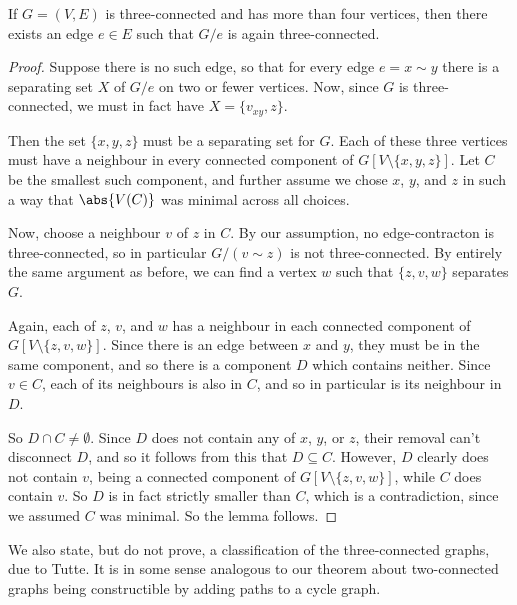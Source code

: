 \documentclass[nobib]{tufte-handout}
\begin{document}
\begin{lemma}\label{lemma:existence_of_contraction_edge}
  If $G = (V,E)$ is three-connected and has more than four vertices, then there exists an edge $e \in E$ such that $G/e$ is again three-connected.

  \begin{proof}
    Suppose there is no such edge, so that for every edge $e = x \sim y$ there is a separating set $X$ of $G/e$ on two or fewer vertices. Now, since $G$ is three-connected, we must in fact have $X = \{v_{xy}, z\}$.

    Then the set $\{x, y, z\}$ must be a separating set for $G$. Each of these three vertices must have a neighbour in every connected component of $G[V \setminus \{x,y,z\}]$. Let $C$ be the smallest such component, and further assume we chose $x$, $y$, and $z$ in such a way that $\abs{V(C)}$ was minimal across all choices.

    Now, choose a neighbour $v$ of $z$ in $C$. By our assumption, no edge-contracton is three-connected, so in particular $G/(v \sim z)$ is not three-connected. By entirely the same argument as before, we can find a vertex $w$ such that $\{z,v,w\}$ separates $G$.

    Again, each of $z$, $v$, and $w$ has a neighbour in each connected component of $G[V \setminus \{z, v, w\}]$. Since there is an edge between $x$ and $y$, they must be in the same component, and so there is a component $D$ which contains neither. Since $v \in C$, each of its neighbours is also in $C$, and so in particular is its neighbour in $D$.

    So $D \cap C \neq \emptyset$. Since $D$ does not contain any of $x$, $y$, or $z$, their removal can't disconnect $D$, and so it follows from this that $D \subseteq C$. However, $D$ clearly does not contain $v$, being a connected component of $G[V \setminus \{z, v, w\}]$, while $C$ does contain $v$. So $D$ is in fact strictly smaller than $C$, which is a contradiction, since we assumed $C$ was minimal. So the lemma follows.
  \end{proof}
\end{lemma}

We also state, but do not prove, a classification of the three-connected graphs, due to Tutte. It is in some sense analogous to our theorem about two-connected graphs being constructible by adding paths to a cycle graph.
\end{document}

